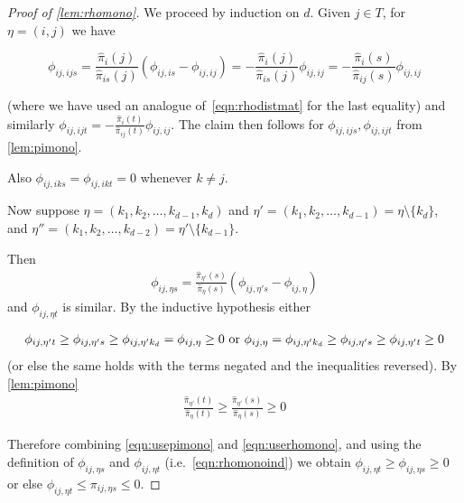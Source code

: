 \documentclass[a4paper, 12p]{article}
\numberwithin{equation}{section}
\newcommand{\piorproj}{\hat{\pi}}
\begin{document}
\begin{proof}[Proof of \cref{lem:rhomono}]
    We proceed by induction on $d$. Given $j \in T$, for $\eta = (i, j)$ we have 
    
    \[
        \phi_{ij,ijs} =  \frac{\piorproj_i(j)}{\piorproj_{is}(j)}(\phi_{ij,is} - \phi_{ij,ij}) = -\frac{\piorproj_i(j)}{\piorproj_{is}(j)}\phi_{ij,ij} = -\frac{\piorproj_i(s)}{\piorproj_{ij}(s)}\phi_{ij,ij}
    \]
        
     (where we have used an analogue of~\eqref{eqn:rhodistmat} for the last equality) and similarly $\phi_{ij,ijt} = -\frac{\piorproj_i(t)}{\piorproj_{ij}(t)}\phi_{ij,ij}$. The claim then follows for $\phi_{ij,ijs}, \phi_{ij,ijt}$ from \cref{lem:pimono}.

    Also $\phi_{ij,iks} = \phi_{ij,ikt} = 0$ whenever $k \neq j$.

    Now suppose $\eta = (k_1, k_2, \dots, k_{d-1}, k_d)$ and $\eta' = (k_1, k_2, \dots, k_{d-1}) = \eta \setminus \{k_d\}$, and $\eta'' = (k_1, k_2, \dots, k_{d-2}) = \eta' \setminus \{k_{d-1}\}$.

    Then 
    \begin{align}
        \phi_{ij,\eta s} = \frac{\piorproj_{\eta'}(s)}{\piorproj_{\eta}(s)}(\phi_{ij,\eta' s} - \phi_{ij,\eta})
        \label{eqn:rhomonoind}
    \end{align}
    and $\phi_{ij,\eta t}$ is similar. By the inductive hypothesis either 
    
    \begin{align}
        \phi_{ij,\eta' t} \geq \phi_{ij,\eta' s} \geq \phi_{ij,\eta' k_d} = \phi_{ij,\eta} \geq  0 \textnormal{ or } \phi_{ij,\eta} = \phi_{ij,\eta' k_d} \geq \phi_{ij,\eta' s} \geq \phi_{ij,\eta' t}  \geq  0 \label{eqn:userhomono}
    \end{align} (or else the same holds with the terms negated and the inequalities reversed).
    By \cref{lem:pimono}
    \begin{align}
        \frac{\piorproj_{\eta'}(t)}{\piorproj_{\eta}(t)}
        \geq \frac{\piorproj_{\eta'}(s)}{\piorproj_{\eta}(s)}
        \geq 0 \label{eqn:usepimono}
    \end{align}

    Therefore combining \eqref{eqn:usepimono} and \eqref{eqn:userhomono}, and using the definition of $\phi_{ij,\eta s}$ and $\phi_{ij,\eta t}$ (i.e.~\eqref{eqn:rhomonoind}) we obtain $\phi_{ij,\eta t} \geq \phi_{ij,\eta s} \geq 0$ or else $\phi_{ij,\eta t} \leq \pi_{ij,\eta s} \leq 0$.
\end{proof}
\end{document}
